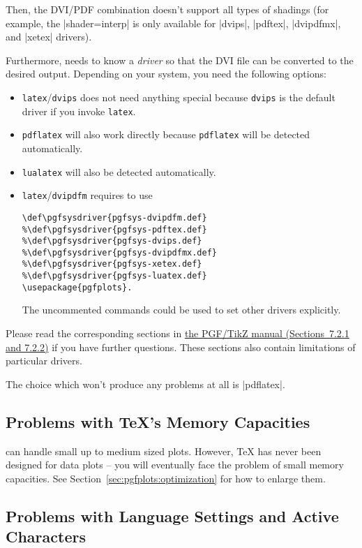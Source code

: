 Then, the DVI/PDF combination doesn't support all types of shadings (for
example, the |shader=interp| is only available for |dvips|, |pdftex|,
|dvipdfmx|, and |xetex| drivers).

Furthermore, \PGF{} needs to know a \emph{driver} so that the DVI file can be
converted to the desired output. Depending on your system, you need the
following options:
%
\begin{itemize}
    \item \lstinline!latex!/\lstinline!dvips! does not need anything special
        because \lstinline!dvips! is the default driver if you invoke
        \lstinline!latex!.
    \item \lstinline!pdflatex! will also work directly because
        \lstinline!pdflatex! will be detected automatically.
    \item \lstinline!lualatex! will also be detected automatically.
    \item \lstinline!latex!/\lstinline!dvipdfm! requires to use
\begin{verbatim}
\def\pgfsysdriver{pgfsys-dvipdfm.def}
%\def\pgfsysdriver{pgfsys-pdftex.def}
%\def\pgfsysdriver{pgfsys-dvips.def}
%\def\pgfsysdriver{pgfsys-dvipdfmx.def}
%\def\pgfsysdriver{pgfsys-xetex.def}
%\def\pgfsysdriver{pgfsys-luatex.def}
\usepackage{pgfplots}.
\end{verbatim}
        The uncommented commands could be used to set other drivers
        explicitly.
\end{itemize}
%
Please read the corresponding sections in
\href{https://tikz.dev/drivers}{the PGF/TikZ manual (Sections~7.2.1 and 7.2.2)}
if you have further questions. These sections also contain limitations of
particular drivers.

The choice which won't produce any problems at all is |pdflatex|.


\subsection{Problems with \TeX's Memory Capacities}

\PGFPlots{} can handle small up to medium sized plots. However, \TeX{} has
never been designed for data plots -- you will eventually face the problem of
small memory capacities. See Section~\ref{sec:pgfplots:optimization} for how to
enlarge them.


\subsection{Problems with Language Settings and Active Characters}


